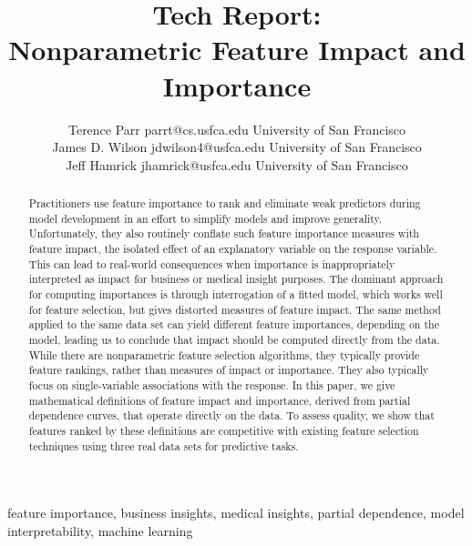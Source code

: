 \documentclass[11pt]{article}
\begin{document}
\def\spacingset#1{\renewcommand{\baselinestretch}%
{#1}\small\normalsize} \spacingset{1}



\title{\bf Tech Report:\\
Nonparametric Feature Impact and Importance}

\author{Terence Parr \email parrt@cs.usfca.edu
\addr University of San Francisco\\
\AND James D. Wilson \email jdwilson4@usfca.edu
\addr University of San Francisco\\
\AND Jeff Hamrick \email jhamrick@usfca.edu
      \addr University of San Francisco}

\maketitle

\begin{abstract}%
Practitioners use feature importance to rank and eliminate weak predictors during model development in an effort to simplify models and improve generality.  Unfortunately, they also routinely conflate such feature importance measures with feature impact, the isolated effect of an explanatory variable on the response variable.   This can lead to real-world consequences when importance is inappropriately interpreted as impact for business or medical insight purposes. The dominant approach for computing importances is through interrogation of a fitted model, which works well for feature selection, but gives distorted measures of feature impact. The same method applied to the same data set can yield different feature importances, depending on the model, leading us to conclude that impact should be computed directly from the data.  While there are nonparametric feature selection algorithms, they typically provide feature rankings, rather than measures of impact or importance. They also typically focus on single-variable associations with the response. In this paper, we give mathematical definitions of feature impact and importance, derived from partial dependence curves, that operate directly on the data. To assess quality, we show that features ranked by these definitions are competitive with existing feature selection techniques using three real data sets for predictive tasks.
\end{abstract}

\begin{keywords}
feature importance, business insights, medical insights, partial dependence, model interpretability, machine learning
\end{keywords}
\end{document}

